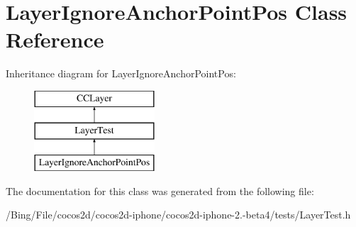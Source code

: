 \hypertarget{interface_layer_ignore_anchor_point_pos}{\section{Layer\-Ignore\-Anchor\-Point\-Pos Class Reference}
\label{interface_layer_ignore_anchor_point_pos}
}
Inheritance diagram for Layer\-Ignore\-Anchor\-Point\-Pos\-:\begin{figure}[H]
\begin{center}
\leavevmode
\includegraphics[height=3.000000cm]{interface_layer_ignore_anchor_point_pos}
\end{center}
\end{figure}


The documentation for this class was generated from the following file\-:\begin{DoxyCompactItemize}
\item 
/\-Bing/\-File/cocos2d/cocos2d-\/iphone/cocos2d-\/iphone-\/2.-\/beta4/tests/Layer\-Test.\-h\end{DoxyCompactItemize}
